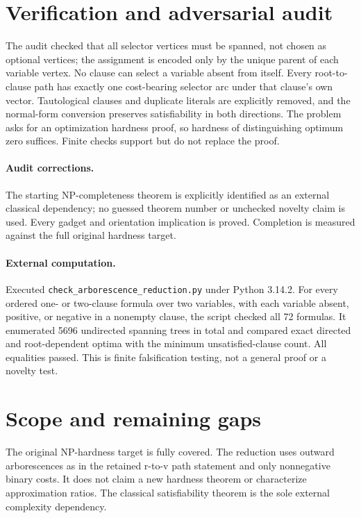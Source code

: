 \documentclass[11pt]{article}
\begin{document}
\section{Verification and adversarial audit}
The audit checked that all selector vertices must be spanned, not chosen as optional vertices; the assignment is encoded only by the unique parent of each variable vertex. No clause can select a variable absent from itself. Every root-to-clause path has exactly one cost-bearing selector arc under that clause's own vector. Tautological clauses and duplicate literals are explicitly removed, and the normal-form conversion preserves satisfiability in both directions. The problem asks for an optimization hardness proof, so hardness of distinguishing optimum zero suffices. Finite checks support but do not replace the proof.
\paragraph{Audit corrections.} The starting NP-completeness theorem is explicitly identified as an external classical dependency; no guessed theorem number or unchecked novelty claim is used. Every gadget and orientation implication is proved. Completion is measured against the full original hardness target.
\paragraph{External computation.} Executed \texttt{check\_arborescence\_reduction.py} under Python 3.14.2. For every ordered one- or two-clause formula over two variables, with each variable absent, positive, or negative in a nonempty clause, the script checked all 72 formulas. It enumerated 5696 undirected spanning trees in total and compared exact directed and root-dependent optima with the minimum unsatisfied-clause count. All equalities passed. This is finite falsification testing, not a general proof or a novelty test.
\section{Scope and remaining gaps}
The original NP-hardness target is fully covered. The reduction uses outward arborescences as in the retained r-to-v path statement and only nonnegative binary costs. It does not claim a new hardness theorem or characterize approximation ratios. The classical satisfiability theorem is the sole external complexity dependency.
\end{document}
